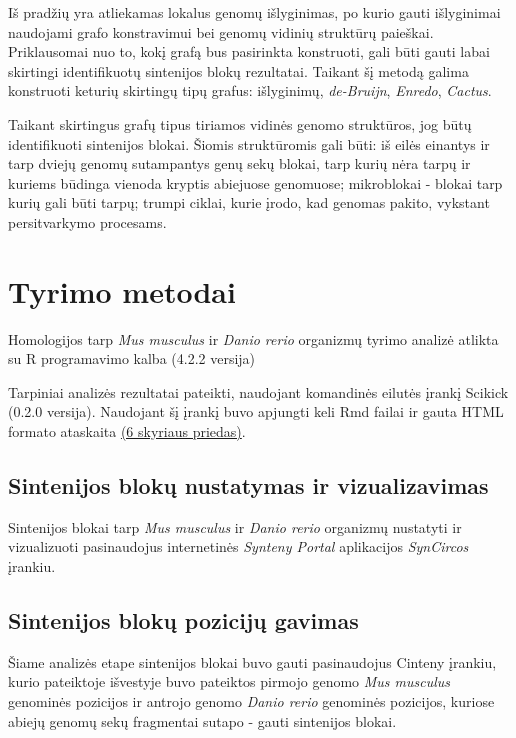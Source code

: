 \documentclass[12pt]{article}
\begin{document}
Iš pradžių yra atliekamas lokalus genomų išlyginimas, po kurio gauti išlyginimai
naudojami grafo konstravimui bei genomų vidinių struktūrų paieškai. Priklausomai
nuo to, kokį grafą bus pasirinkta konstruoti, gali būti gauti labai skirtingi
identifikuotų sintenijos blokų rezultatai. Taikant šį metodą galima konstruoti
keturių skirtingų tipų grafus: išlyginimų, \emph{de-Bruijn}, \emph{Enredo},
\emph{Cactus}.

Taikant skirtingus grafų tipus tiriamos vidinės genomo struktūros, jog būtų
identifikuoti sintenijos blokai. Šiomis struktūromis gali būti: iš eilės
einantys ir tarp dviejų genomų sutampantys genų sekų blokai, tarp kurių nėra
tarpų ir kuriems būdinga vienoda kryptis abiejuose genomuose; mikroblokai -
blokai tarp kurių gali būti tarpų; trumpi ciklai, kurie įrodo, kad genomas
pakito, vykstant persitvarkymo procesams.

\newpage


\section{Tyrimo metodai}
Homologijos tarp \emph{Mus musculus} ir \emph{Danio rerio} organizmų
tyrimo analizė atlikta su R programavimo kalba\cite{R} (4.2.2 versija)

Tarpiniai analizės rezultatai pateikti, naudojant komandinės eilutės įrankį
Scikick\cite{SCIK} (0.2.0 versija). Naudojant šį įrankį buvo apjungti keli Rmd
failai ir gauta HTML formato ataskaita \hyperref[Priedas]{(6 skyriaus priedas)}.

\subsection{Sintenijos blokų nustatymas ir vizualizavimas}
Sintenijos blokai tarp \emph{Mus musculus} ir \emph{Danio rerio} organizmų
nustatyti ir vizualizuoti pasinaudojus internetinės
\emph{Synteny Portal}\cite{SYN_PORT} aplikacijos \emph{SynCircos} įrankiu.

\subsection{Sintenijos blokų pozicijų gavimas}
Šiame analizės etape sintenijos blokai buvo gauti pasinaudojus Cinteny
įrankiu, kurio pateiktoje išvestyje buvo pateiktos pirmojo genomo
\emph{Mus musculus} genominės pozicijos ir antrojo genomo \emph{Danio rerio}
genominės pozicijos, kuriose abiejų genomų sekų fragmentai sutapo - gauti
sintenijos blokai.
\end{document}
